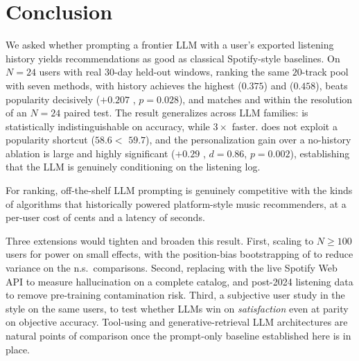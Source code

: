 \section{Conclusion}
\label{sec:conclusion}

We asked whether prompting a frontier LLM with a user's exported listening history yields recommendations as good as classical Spotify-style baselines. On $N{=}24$ \lastfm users with real $30$-day held-out windows, ranking the same $20$-track pool with seven methods, \claude with history achieves the highest \ndcg ($0.375$) and \mrr ($0.458$), beats popularity decisively ($+0.207$ \ndcg, $p{=}0.028$), and matches \cbf and \itemknn within the resolution of an $N{=}24$ paired test. The result generalizes across LLM families: \gpt is statistically indistinguishable on accuracy, while $3\times$ faster. \claude does not exploit a popularity shortcut (\arp $58.6 < $ \cbf $59.7$), and the personalization gain over a no-history ablation is large and highly significant ($+0.29$ \ndcg, $d{=}0.86$, $p{=}0.002$), establishing that the LLM is genuinely conditioning on the listening log.

 For ranking, off-the-shelf LLM prompting is genuinely competitive with the kinds of algorithms that historically powered platform-style music recommenders, at a per-user cost of cents and a latency of seconds.

 Three extensions would tighten and broaden this result. First, scaling to $N \ge 100$ users for power on small effects, with the position-bias bootstrapping of \citet{hou2024llm} to reduce variance on the n.s.\ comparisons. Second, replacing \spotcat with the live Spotify Web API to measure hallucination on a complete catalog, and post-2024 listening data to remove pre-training contamination risk. Third, a subjective user study in the \citet{boadana2025llm} style on the same users, to test whether LLMs win on \emph{satisfaction} even at parity on objective accuracy. Tool-using and generative-retrieval LLM architectures \citep{doh2025talkplay,palumbo2025text2tracks} are natural points of comparison once the prompt-only baseline established here is in place.
